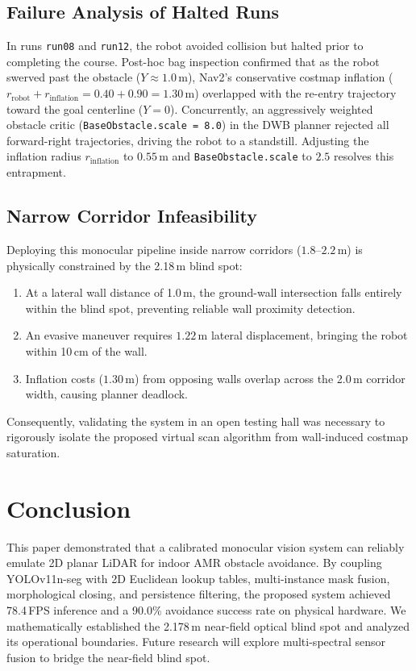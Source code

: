 \documentclass[12pt]{iopart}
\begin{document}
\subsection{Failure Analysis of Halted Runs}
In runs \texttt{run08} and \texttt{run12}, the robot avoided collision but halted prior to completing the course. Post-hoc bag inspection confirmed that as the robot swerved past the obstacle ($Y \approx 1.0$\,m), Nav2's conservative costmap inflation ($r_{\mathrm{robot}} + r_{\mathrm{inflation}} = 0.40 + 0.90 = 1.30$\,m) overlapped with the re-entry trajectory toward the goal centerline ($Y=0$). Concurrently, an aggressively weighted obstacle critic (\texttt{BaseObstacle.scale}\allowbreak\texttt{ = 8.0}) in the DWB planner rejected all forward-right trajectories, driving the robot to a standstill. Adjusting the inflation radius $r_{\mathrm{inflation}}$ to $0.55$\,m and \texttt{BaseObstacle.scale} to $2.5$ resolves this entrapment.

\subsection{Narrow Corridor Infeasibility}
Deploying this monocular pipeline inside narrow corridors ($1.8\text{--}2.2$\,m) is physically constrained by the 2.18\,m blind spot:
\begin{enumerate}
  \item At a lateral wall distance of 1.0\,m, the ground-wall intersection falls entirely within the blind spot, preventing reliable wall proximity detection.
  \item An evasive maneuver requires $1.22$\,m lateral displacement, bringing the robot within 10\,cm of the wall.
  \item Inflation costs ($1.30$\,m) from opposing walls overlap across the 2.0\,m corridor width, causing planner deadlock.
\end{enumerate}
Consequently, validating the system in an open testing hall was necessary to rigorously isolate the proposed virtual scan algorithm from wall-induced costmap saturation.

\section{Conclusion}
\label{sec:conclusion}

This paper demonstrated that a calibrated monocular vision system can reliably emulate 2D planar LiDAR for indoor AMR obstacle avoidance. By coupling YOLOv11n-seg with 2D Euclidean lookup tables, multi-instance mask fusion, morphological closing, and persistence filtering, the proposed system achieved 78.4\,FPS inference and a 90.0\% avoidance success rate on physical hardware. We mathematically established the 2.178\,m near-field optical blind spot and analyzed its operational boundaries. Future research will explore multi-spectral sensor fusion to bridge the near-field blind spot.
\end{document}
